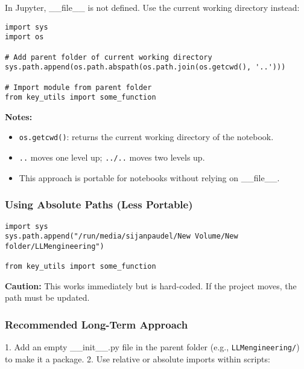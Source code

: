 In Jupyter, \_\_file\_\_ is not defined. Use the current working directory instead:

\begin{tcolorbox}[colback=gray!5, colframe=gray!80!black, title=Jupyter Notebook: Using os.getcwd()]
\begin{verbatim}
import sys
import os

# Add parent folder of current working directory
sys.path.append(os.path.abspath(os.path.join(os.getcwd(), '..')))

# Import module from parent folder
from key_utils import some_function
\end{verbatim}
\end{tcolorbox}

\textbf{Notes:}
\begin{itemize}
    \item \texttt{os.getcwd()}: returns the current working directory of the notebook.
    \item \texttt{..} moves one level up; \texttt{../..} moves two levels up.
    \item This approach is portable for notebooks without relying on \_\_file\_\_.
\end{itemize}

\subsubsection{Using Absolute Paths (Less Portable)}

\begin{tcolorbox}[colback=gray!5, colframe=gray!80!black, title=Absolute Path Approach]
\begin{verbatim}
import sys
sys.path.append("/run/media/sijanpaudel/New Volume/New folder/LLMengineering")

from key_utils import some_function
\end{verbatim}
\end{tcolorbox}


\textbf{Caution:} This works immediately but is hard-coded. If the project moves, the path must be updated.

\subsubsection{Recommended Long-Term Approach}

1. Add an empty \_\_init\_\_.py file in the parent folder (e.g., \texttt{LLMengineering/}) to make it a package.
2. Use relative or absolute imports within scripts:

